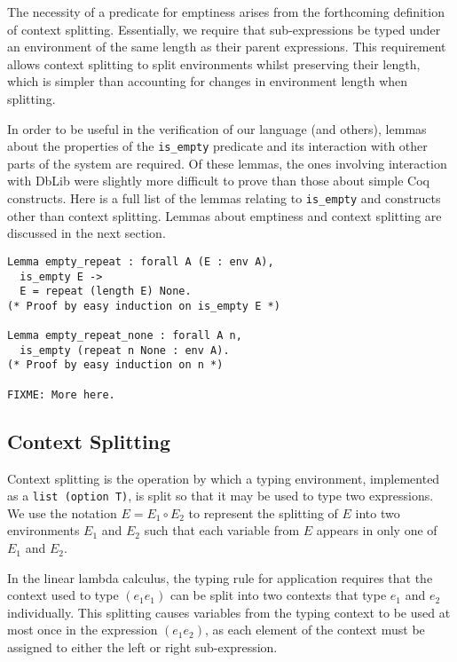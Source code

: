 \documentclass[]{unswthesis}
\let\c\texttt
\begin{document}
The necessity of a predicate for emptiness arises from the forthcoming definition of context splitting. Essentially, we require that sub-expressions be typed under an environment of the same length as their parent expressions. This requirement allows context splitting to split environments whilst preserving their length, which is simpler than accounting for changes in environment length when splitting.

In order to be useful in the verification of our language (and others), lemmas about the properties of the \c{is_empty} predicate and its interaction with other parts of the system are required. Of these lemmas, the ones involving interaction with DbLib were slightly more difficult to prove than those about simple Coq constructs. Here is a full list of the lemmas relating to \c{is_empty} and constructs other than context splitting. Lemmas about emptiness and context splitting are discussed in the next section.

\begin{verbatim}
Lemma empty_repeat : forall A (E : env A),
  is_empty E ->
  E = repeat (length E) None.
(* Proof by easy induction on is_empty E *)

Lemma empty_repeat_none : forall A n,
  is_empty (repeat n None : env A).
(* Proof by easy induction on n *)

FIXME: More here.
\end{verbatim}

\subsection{Context Splitting}


Context splitting is the operation by which a typing environment, implemented as a \c{list (option T)}, is split so that it may be used to type two expressions. We use the notation $E = E_1 \circ E_2$ to represent the splitting of $E$ into two environments $E_1$ and $E_2$ such that each variable from $E$ appears in only one of $E_1$ and $E_2$.

In the linear lambda calculus, the typing rule for application requires that the context used to type $(e_1 e_1)$ can be split into two contexts that type $e_1$ and $e_2$ individually. This splitting causes variables from the typing context to be used at most once in the expression $(e_1 e_2)$, as each element of the context must be assigned to either the left or right sub-expression.
\end{document}
